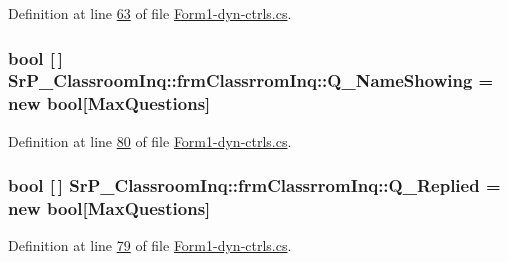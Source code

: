 \-Definition at line \hyperlink{_form1-dyn-ctrls_8cs_source_l00063}{63} of file \hyperlink{_form1-dyn-ctrls_8cs_source}{\-Form1-\/dyn-\/ctrls.\-cs}.

\hypertarget{class_sr_p___classroom_inq_1_1frm_classrrom_inq_a717931be8f79e53cf69e10515df3115e}{
\subsubsection[{\-Q\-\_\-\-Name\-Showing}]{\setlength{\rightskip}{0pt plus 5cm}bool \mbox{[}$\,$\mbox{]} {\bf \-Sr\-P\-\_\-\-Classroom\-Inq\-::frm\-Classrrom\-Inq\-::\-Q\-\_\-\-Name\-Showing} = new bool\mbox{[}{\bf \-Max\-Questions}\mbox{]}}}
\label{class_sr_p___classroom_inq_1_1frm_classrrom_inq_a717931be8f79e53cf69e10515df3115e}


\-Definition at line \hyperlink{_form1-dyn-ctrls_8cs_source_l00080}{80} of file \hyperlink{_form1-dyn-ctrls_8cs_source}{\-Form1-\/dyn-\/ctrls.\-cs}.

\hypertarget{class_sr_p___classroom_inq_1_1frm_classrrom_inq_af7c089d129d15a45c05bede3e9554f58}{
\subsubsection[{\-Q\-\_\-\-Replied}]{\setlength{\rightskip}{0pt plus 5cm}bool \mbox{[}$\,$\mbox{]} {\bf \-Sr\-P\-\_\-\-Classroom\-Inq\-::frm\-Classrrom\-Inq\-::\-Q\-\_\-\-Replied} = new bool\mbox{[}{\bf \-Max\-Questions}\mbox{]}}}
\label{class_sr_p___classroom_inq_1_1frm_classrrom_inq_af7c089d129d15a45c05bede3e9554f58}


\-Definition at line \hyperlink{_form1-dyn-ctrls_8cs_source_l00079}{79} of file \hyperlink{_form1-dyn-ctrls_8cs_source}{\-Form1-\/dyn-\/ctrls.\-cs}.

